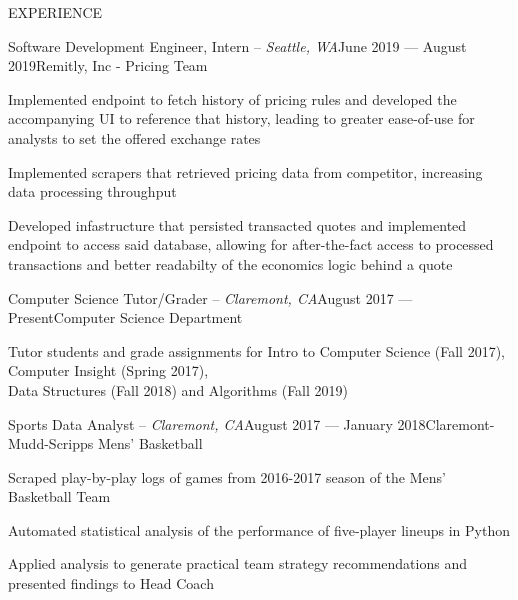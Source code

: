 \documentclass{resume} %
\begin{document}
\begin{rSection}{EXPERIENCE}
\begin{rSubsection}{Software
Development Engineer, Intern -- {\it Seattle, WA}}{June 2019 --- August 2019}{Remitly, Inc - Pricing Team}

\item Implemented endpoint to fetch history of pricing rules and developed the accompanying UI to reference that history, leading to greater ease-of-use for analysts to set the offered exchange rates
\item Implemented scrapers that retrieved pricing data from competitor, increasing data processing throughput
\item Developed infastructure that persisted transacted quotes and implemented endpoint to access said database, allowing for after-the-fact access to processed transactions and better readabilty of the economics logic behind a quote

\end{rSubsection}
\begin{rSubsection}{Computer Science Tutor/Grader -- {\it Claremont, CA}}{August 2017 --- Present}{Computer Science Department}

\item Tutor students and grade assignments for Intro to Computer Science (Fall 2017), Computer Insight (Spring 2017),\\Data Structures (Fall 2018) and Algorithms (Fall 2019)
\end{rSubsection}

\begin{rSubsection}{Sports Data Analyst -- {\it Claremont, CA}}{August 2017 --- January 2018}{Claremont-Mudd-Scripps Mens' Basketball}

\item Scraped play-by-play logs of games from 2016-2017 season of the Mens' Basketball Team
\item Automated statistical analysis of the performance of five-player lineups in Python
\item Applied analysis to generate practical team strategy recommendations and presented findings to Head Coach

\end{rSubsection}
\end{rSection}
\end{document}
